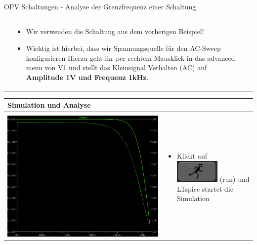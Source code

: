 \begin{frame}[t]{OPV Schaltungen - Analyse der Grenzfrequenz einer Schaltung }
\begin{spacing}{0.9}
\begin{tiny}
\begin{table}[h!]
\begin{tabular}{p{2cm} p{2cm} p{6cm}}
\begin{minipage}{.2\textwidth}
          \end{minipage}
           &
          \begin{minipage}{.5\textwidth}
            \begin{itemize}
              \item Wir verwenden die Schaltung aus dem vorherigen Beispiel!
              \item Wichtig ist hierbei, dass wir Spannungsquelle für den AC-Sweep konfigurieren
                    Hierzu geht ihr per rechtem Mausklick in das advanced menu von V1 und stellt das Kleinsignal Verhalten (AC)
                    auf \textbf{Amplitude 1V und Frequenz 1kHz}.
            \end{itemize}
          \end{minipage}
          \\
        \end{tabular}
        \begin{tabular}{p{6cm} p{4cm}}
          \hline
          \textbf{Simulation und Analyse} & \\
          \hline                            \\
          \begin{minipage}{.6\textwidth}
            \includegraphics[width=0.7\linewidth]{pictures/analysis_6.png}
          \end{minipage}
                                          &
          \begin{minipage}{.4\textwidth}
            \begin{itemize}
              \item Klickt auf \includegraphics[scale=0.3]{pictures/run.png} (run) und LTspice startet die Simulation

\end{itemize}
\end{minipage}
\end{tabular}
\end{table}
\end{tiny}
\end{spacing}
\end{frame}
